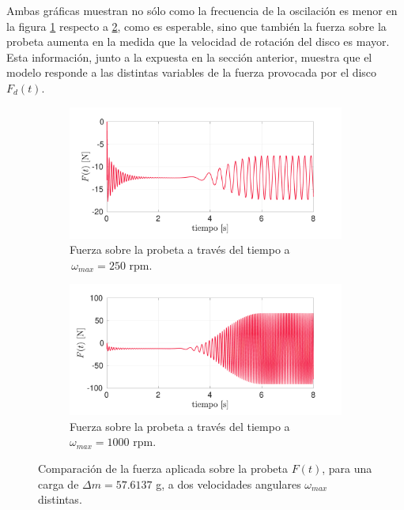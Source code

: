 Ambas gráficas muestran no sólo como la frecuencia de la oscilación es menor en la figura \ref{fig:f_w250} respecto a \ref{fig:f_w1000}, como es esperable, sino que también la fuerza sobre la probeta aumenta en la medida que la velocidad de rotación del disco es mayor. Esta información, junto a la expuesta en la sección anterior, muestra que el modelo responde a las distintas variables de la fuerza provocada por el disco $F_d(t)$. 

\begin{figure}[p]
\centering
	\begin{subfigure}{1\linewidth}
		\centering
		\includegraphics[width=\linewidth, trim={0cm 0cm 2cm 0cm},clip]{Imagenes/f_w250.pdf}
		\caption{Fuerza sobre la probeta a través del tiempo a $\,\omega_{max}=250$ rpm.}
		\label{fig:f_w250}
	\end{subfigure}
	\begin{subfigure}{1\linewidth}
		\centering
		\includegraphics[width=\linewidth, trim={0cm 0cm 2cm 0cm},clip]{Imagenes/f_w1000.pdf}
		\caption{Fuerza sobre la probeta a través del tiempo a $\omega_{max}=1000$ rpm.}
		\label{fig:f_w1000}
	\end{subfigure}
\caption{Comparación de la fuerza aplicada sobre la probeta $F(t)$, para una carga de $\Delta m = 57.6137$ g, a dos velocidades angulares $\omega_{max}$ distintas.}
\label{fig:f_w520}
\end{figure}

